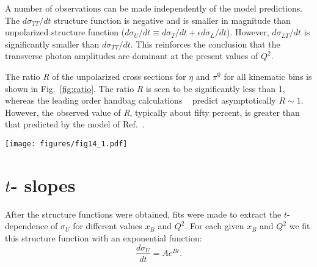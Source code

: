 \documentclass[prc,aps,floatfix,showpacs,showkeys,twocolumn,superscriptaddress,letterpaper,10pt]{revtex4-1}
\begin{document}
 


 A number of observations can be made independently of the model predictions. The 
$d\sigma_{TT}/dt$ structure function is negative  and  is smaller in magnitude than unpolarized structure function 
 ($d\sigma_U/dt \equiv d\sigma_T/dt+\epsilon d\sigma_L/dt$).
  However, $d\sigma_{LT}/dt$ is significantly smaller  than $d\sigma_{TT}/dt$.
 This reinforces the conclusion that  the transverse photon amplitudes  are dominant at the present values of $Q^2$. 
  

The ratio {\it R} of the unpolarized cross sections for $\eta$ and $\pi^0$  for all kinematic bins is shown in Fig.~\ref{fig:ratio}.  The ratio {\it R} is seen to be significantly less than 1, whereas the leading order handbag calculations ~\cite{Eides:1998ch} predict asymptotically $R \sim 1$. However, the observed value of {\it R}, typically about fifty percent, is greater than that predicted by the model of Ref.~\cite{Goloskokov:2011rd}.

\begin{figure*}
\texttt{[image: figures/fig14\_1.pdf]}
\caption{
The ratio $R$ of the unpolarized structure functions for $\eta$ and $\pi^0$ extracted from the present experiment and Ref.~\cite{Bedlinskiy:2012be}, as functions of $t$ for $(Q^2,x_B)$ bins.   The leading order handbag calculations~\cite{Eides:1998ch} predict asymptotically $R \sim 1$. The curves are the result of a  handbag based calculation of Ref.~\cite{Goloskokov:2011rd}.
The inset is an enlarged view of the bin with $x_B=0.28$ and $Q^2=2.2$ GeV$^2$.
The error bars are statistical only.
}
\label{fig:ratio}
\end{figure*}




\section{$t$- slopes}

After the structure functions were obtained, fits
were made to extract the $t$-dependence of $\sigma_U$ for different values $x_B$ and $Q^2$.
For each given $x_B$ and $Q^2$ we fit this structure function with an exponential function: $$\frac{d\sigma_U}{dt}=Ae^{Bt}.$$
\end{document}

